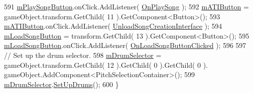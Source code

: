 \begin{DoxyCode}
591         \hyperlink{group___s_c_priv_var_ga8afebf9e2e92619f9ef9cfe5410a143a}{mPlaySongButton}.onClick.AddListener( \hyperlink{group___s_c_handlers_gab333656dbc41fbebb320a30c48501370}{OnPlaySong} );
592         \hyperlink{group___s_c_priv_var_gacc018689b7f6508762958c3796a68937}{mATIButton} = gameObject.transform.GetChild( 11 ).GetComponent<Button>();
593         \hyperlink{group___s_c_priv_var_gacc018689b7f6508762958c3796a68937}{mATIButton}.onClick.AddListener( \hyperlink{group___s_c_handlers_gae631852736624d333cc26e1ae9d14871}{UnloadSongCreationInterface} );
594         \hyperlink{group___s_c_priv_var_ga0e016451dff405f570bf530586fb36fa}{mLoadSongButton} = transform.GetChild( 13 ).GetComponent<Button>();
595         \hyperlink{group___s_c_priv_var_ga0e016451dff405f570bf530586fb36fa}{mLoadSongButton}.onClick.AddListener( 
      \hyperlink{group___s_c_handlers_ga77a56bedfce632cf7c341f8fefc02b9a}{OnLoadSongButtonClicked} );
596 
597         \textcolor{comment}{// Set up the drum selector.}
598         \hyperlink{group___s_c_priv_var_ga3f1c71d8cabe505745220d728c6f97bc}{mDrumSelector} = gameObject.transform.GetChild( 12 ).GetChild( 0 ).GetChild( 0 ).
      gameObject.AddComponent<PitchSelectionContainer>();
599         \hyperlink{group___s_c_priv_var_ga3f1c71d8cabe505745220d728c6f97bc}{mDrumSelector}.\hyperlink{group___s_c_handlers_gae0bda65460aedf8384cd51bd6079d85b}{SetUpDrums}();
600     \}
\end{DoxyCode}
